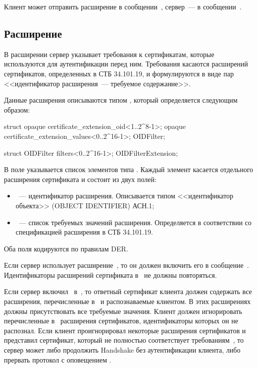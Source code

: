 Клиент может отправить расширение 
в сообщении~, сервер~---
в сообщении~. 

\subsection{Расширение }\label{HS.Ext.of} 

В расширении  сервер указывает требования к сертификатам, 
которые используются для аутентификации перед ним. Требования касаются 
расширений сертификатов, определенных в СТБ 34.101.19, 
и формулируются в виде пар <<идентификатор расширения~--- 
требуемое содержание>>.

Данные расширения  описываются типом 
, который определяется следующим образом: 

\begin{codeblock}
struct {
  opaque certificate_extension_oid<1..2^8-1>;
  opaque certificate_extension_values<0..2^16-1>;
} OIDFilter;

struct {
  OIDFilter filters<0..2^16-1>;
} OIDFilterExtension;
\end{codeblock}

В поле  указывается список элементов типа . 
%
Каждый элемент касается отдельного расширения сертификата и состоит из двух 
полей:
\begin{itemize}
\item
{}~--- идентификатор расширения.
Описывается типом <<идентификатор объекта>> (OBJECT IDENTIFIER) АСН.1;

\item
{}~--- список требуемых значений расширения.
Определяется в соответствии со спецификацией расширения в СТБ 34.101.19.
\end{itemize}

Оба поля кодируются по правилам DER.

Если сервер использует расширение~, то он должен 
включить его в сообщение~. 
%
Идентификаторы расширений сертификата в~ не должны 
повторяться.

Если сервер включил~ в~, то 
ответный сертификат клиента должен содержать все расширения, перечисленные
в~ и распознаваемые клиентом.
%
В этих расширениях должны присутствовать все требуемые значения.
%
Клиент должен игнорировать перечисленные в~ расширения 
сертификатов, идентификаторы которых он не распознал.
%
Если клиент проигнорировал некоторые расширения сертификатов и представил 
сертификат, который не полностью соответствует требованиям~, 
то сервер может либо продолжить Handshake без аутентификации клиента, либо 
прервать протокол с оповещением .

